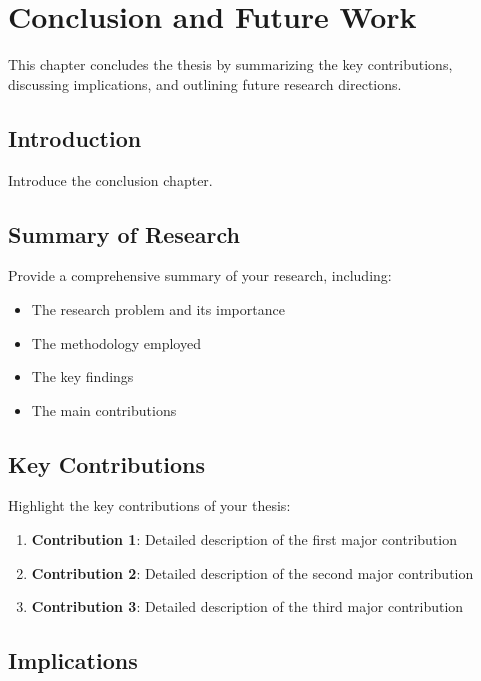 \chapter{Conclusion and Future Work}
\label{ch:conclusion}

This chapter concludes the thesis by summarizing the key contributions, discussing implications, and outlining future research directions.

\section{Introduction}
\label{sec:conc-introduction}

Introduce the conclusion chapter.

\section{Summary of Research}
\label{sec:research-summary}

Provide a comprehensive summary of your research, including:

\begin{itemize}
    \item The research problem and its importance
    \item The methodology employed
    \item The key findings
    \item The main contributions
\end{itemize}

\section{Key Contributions}
\label{sec:key-contributions}

Highlight the key contributions of your thesis:

\begin{enumerate}
    \item \textbf{Contribution 1}: Detailed description of the first major contribution
    \item \textbf{Contribution 2}: Detailed description of the second major contribution
    \item \textbf{Contribution 3}: Detailed description of the third major contribution
\end{enumerate}

\section{Implications}
\label{sec:implications}


